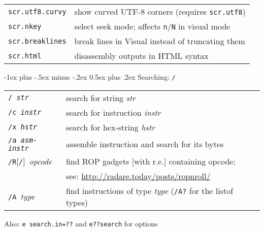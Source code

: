 \documentclass[a4paper,landscape]{article}
\makeatletter
\renewcommand{\section}{\@startsection{section}{1}{0mm}%
                                {-1ex plus -.5ex minus -.2ex}%
                                {0.5ex plus .2ex}%
                                {\normalfont\large\bfseries}}
\renewcommand{\subsubsection}{\@startsection{subsubsection}{3}{0mm}%
                                {-1ex plus -.5ex minus -.2ex}%
                                {1ex plus .2ex}%
                                {\normalfont\small\bfseries}}
\makeatother
\begin{document}
\begin{multicols*}{3}
\begin{tabular}{@{}ll@{}}
\texttt{scr.utf8.curvy} & show curved UTF-8 corners (requires \texttt{scr.utf8}) \\
\texttt{scr.nkey} & select seek mode; affects \texttt{n}/\texttt{N} in visual mode \\
\texttt{scr.breaklines} & break lines in Visual instead of truncating them \\
\texttt{scr.html} & disassembly outputs in HTML syntax \\
\end{tabular}

\section{Searching: \texttt{/}}
\begin{tabular}{@{}ll@{}}
\texttt{/ \textit{str}} & search for string \textit{str} \\
\texttt{/c \textit{instr}} & search for instruction \textit{instr} \\
\texttt{/x \textit{hstr}} & search for hex-string \textit{hstr} \\
\texttt{/a \textit{asm-instr}} & assemble instruction and search for its bytes \\
\texttt{/R}[\texttt{/}]\ \textit{opcode} & find ROP gadgets [with r.e.] containing opcode; \\ & see: \url{http://radare.today/posts/ropnroll/} \\
\texttt{/A }\textit{type} & find instructions of type \textit{type} (\texttt{/A?} for the listof types) \\
\end{tabular}

Also: \texttt{e search.in=??} and \texttt{e??search} for options


\end{multicols*}
\end{document}
